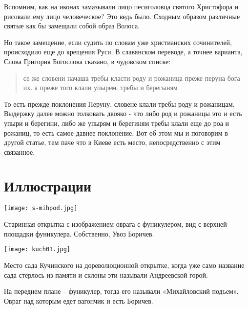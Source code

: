\documentclass[a5paper,11pt,openany]{article}
\begin{document}
    Вспомним, как на иконах замазывали лицо песиголовца святого Христофора и рисовали ему лицо человеческое? Это ведь было. Сходным образом различные святые как бы замещали собой образ Волоса.

   Но такое замещение, если судить по словам уже христианских сочинителей, происходило еще до крещения Руси. В славянском переводе, а точнее варианта, Слова Григория Богослова сказано, в чудовском списке:

\begin{quotation}
\noindent се же словени начаша требы класти роду и рожаница преже перуна бога их. а преже того клали упырем. требы и берегыням
\end{quotation}

То есть прежде поклонения Перуну, словене клали требы роду и рожаницам. Выдержку далее можно толковать двояко - что либо род и рожаницы это и есть упыри и берегини, либо же упырям и берегиням требы клали еще до роа и рожаниц, то есть самое давнее поклонение. 
   Вот об этом мы и поговорим в другой статье, тем паче что в Киеве есть место, непосредственно с этим связанное.



\newpage

\section{Иллюстрации}

\vspace*{\fill}

\begin{center}
\texttt{[image: s-mihpod.jpg]}
\end{center}

Старинная открытка с изображением оврага с фуникулером, вид с верхней площадки фуникулера. Собственно, Увоз Боричев.

\vspace*{\fill}

\newpage

\vspace*{\fill}

\begin{center}
\texttt{[image: kuch01.jpg]}
\end{center}

Место сада Кучинского на дореволюционной открытке, когда уже само название сада стёрлось из памяти и склоны эти называли Андреевской горой.

На переднем плане – фуникулер, тогда его называли «Михайловский подъем». Овраг над которым едет вагончик и есть Боричев.
\end{document}
